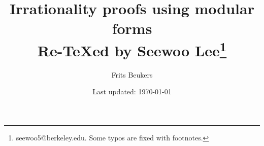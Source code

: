 \documentclass[letterpaper, 12pt]{article}
\begin{document}

\title{Irrationality proofs using modular forms \\[1em]
\normalsize Re-\TeX ed by Seewoo Lee\footnote{seewoo5@berkeley.edu. Some typos are fixed with footnotes.}}


\author{Frits Beukers}
\date{\normalsize\vspace{-1ex} Last updated: \today}


\maketitle





















\end{document}

